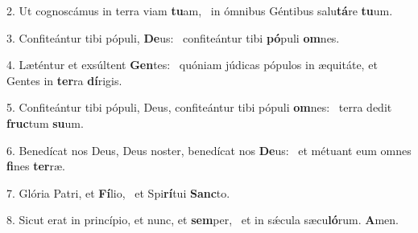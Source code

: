 2. Ut cognoscámus in terra viam \textbf{tu}am, \ast\  in ómnibus Géntibus salu\textbf{tá}re \textbf{tu}um.\

3. Confiteántur tibi pópuli, \textbf{De}us: \ast\  confiteántur tibi \textbf{pó}puli \textbf{om}nes.\

4. Læténtur et exsúltent \textbf{Gen}tes: \ast\  quóniam júdicas pópulos in æquitáte, et Gentes in \textbf{ter}ra \textbf{dí}rigis.\

5. Confiteántur tibi pópuli, Deus, confiteántur tibi pópuli \textbf{om}nes: \ast\  terra dedit \textbf{fruc}tum \textbf{su}um.\

6. Benedícat nos Deus, Deus noster, benedícat nos \textbf{De}us: \ast\  et métuant eum omnes \textbf{fi}nes \textbf{ter}ræ.\

7. Glória Patri, et \textbf{Fí}lio, \ast\  et Spi\textbf{rí}tui \textbf{Sanc}to.\

8. Sicut erat in princípio, et nunc, et \textbf{sem}per, \ast\  et in sǽcula sæcu\textbf{ló}rum. \textbf{A}men.\

